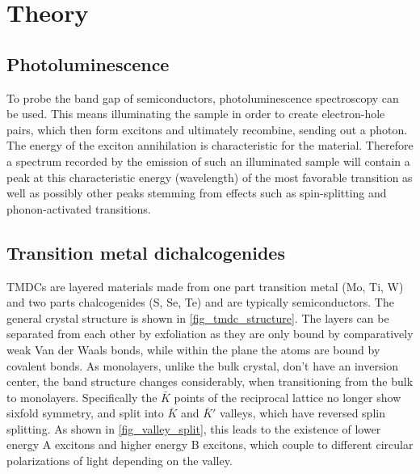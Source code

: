 \section{Theory}
\label{sec:theory}

\subsection{Photoluminescence}

To probe the band gap of semiconductors, photoluminescence spectroscopy can be used.
This means illuminating the sample in order to create electron-hole pairs, which then form excitons and ultimately recombine, sending out a photon.
The energy of the exciton annihilation is characteristic for the material.
Therefore a spectrum recorded by the emission of such an illuminated sample will contain a peak at this characteristic energy (wavelength) of the most favorable transition as well as possibly other peaks stemming from effects such as spin-splitting and phonon-activated transitions.

\subsection{Transition metal dichalcogenides}

TMDCs are layered materials made from one part transition metal (Mo, Ti, W) and two parts chalcogenides (S, Se, Te) and are typically semiconductors.
The general crystal structure is shown in \cref{fig_tmdc_structure}.
The layers can be separated from each other by exfoliation as they are only bound by comparatively weak Van der Waals bonds, while within the plane the atoms are bound by covalent bonds.
As monolayers, unlike the bulk crystal, don't have an inversion center, the band structure changes considerably, when transitioning from the bulk to monolayers.
Specifically the $\bar{K}$ points of the reciprocal lattice no longer show sixfold symmetry, and split into $\bar{K}$ and $\bar{K}'$ valleys, which have reversed splin splitting.
As shown in \cref{fig_valley_split}, this leads to the existence of lower energy A excitons and higher energy B excitons, which couple to different circular polarizations of light depending on the valley.

